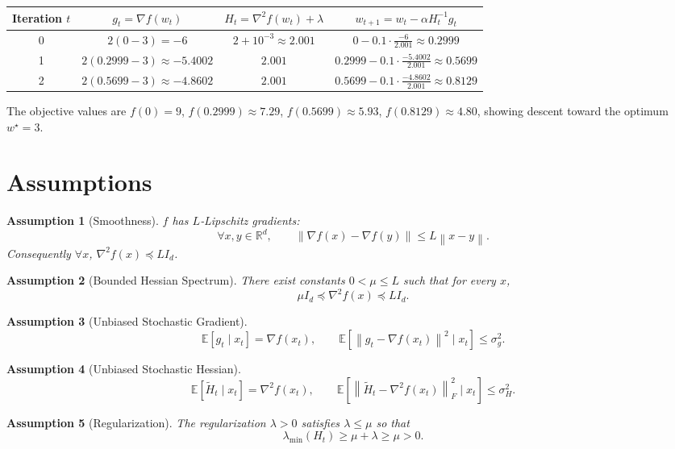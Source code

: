\documentclass{article}
\newtheorem{assumption}{Assumption}
\newcommand{\EE}{\mathbb{E}}
\newcommand{\RR}{\mathbb{R}}
\newcommand{\norm}[1]{\left\|#1\right\|}
\begin{document}
\begin{tabular}{c|c|c|c}
Iteration $t$ & $g_t= \nabla f(w_t)$ & $H_t= \nabla^{2}f(w_t)+\lambda$ & $w_{t+1}=w_t-\alpha H_t^{-1}g_t$\\ \hline
0 & $2(0-3)=-6$ & $2+10^{-3}\approx2.001$ & $0-0.1\cdot\frac{-6}{2.001}\approx0.2999$\\
1 & $2(0.2999-3)\approx-5.4002$ & $2.001$ & $0.2999-0.1\cdot\frac{-5.4002}{2.001}\approx0.5699$\\
2 & $2(0.5699-3)\approx-4.8602$ & $2.001$ & $0.5699-0.1\cdot\frac{-4.8602}{2.001}\approx0.8129$
\end{tabular}

The objective values are $f(0)=9$, $f(0.2999)\approx7.29$, $f(0.5699)\approx5.93$, $f(0.8129)\approx4.80$, showing descent toward the optimum $w^\star=3$.

\section*{Assumptions}
\begin{assumption}[Smoothness]\label{ass:smooth}
$f$ has $L$‑Lipschitz gradients:
\[
\forall x,y\in\RR^{d},\qquad 
\norm{\nabla f(x)-\nabla f(y)}\le L\norm{x-y}.
\]
Consequently $\forall x$, $\nabla^{2}f(x)\preceq L I_d$.
\end{assumption}
\begin{assumption}[Bounded Hessian Spectrum]\label{ass:hessian}
There exist constants $0<\mu\le L$ such that for every $x$,
\[
\mu I_d \preceq \nabla^{2} f(x) \preceq L I_d .
\]
\end{assumption}
\begin{assumption}[Unbiased Stochastic Gradient]\label{ass:unbiased-grad}
\[
\EE[g_t\mid x_t]=\nabla f(x_t),\qquad 
\EE\!\left[\norm{g_t-\nabla f(x_t)}^{2}\mid x_t\right]\le\sigma_g^{2}.
\]
\end{assumption}
\begin{assumption}[Unbiased Stochastic Hessian]\label{ass:unbiased-hess}
\[
\EE[\widetilde H_t\mid x_t]=\nabla^{2} f(x_t),\qquad 
\EE\!\left[\norm{\widetilde H_t-\nabla^{2} f(x_t)}_{F}^{2}\mid x_t\right]\le\sigma_H^{2}.
\]
\end{assumption}
\begin{assumption}[Regularization]\label{ass:regular}
The regularization $\lambda>0$ satisfies $\lambda\le \mu$ so that
\[
\lambda_{\min}(H_t)\ge \mu+\lambda\ge \mu>0 .
\]
\end{assumption}
\end{document}
